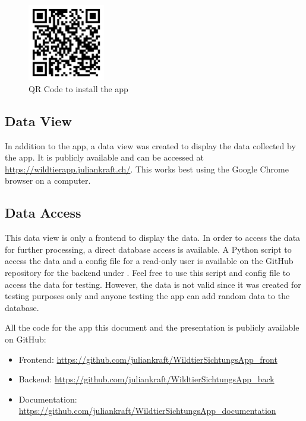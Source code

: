 \documentclass{josis}
\begin{document}
\begin{figure}[tbh]
    \centering
    \includegraphics[width=0.3\textwidth]{images/qr_code_app.png}
    \caption{QR Code to install the app}\label{fig:qr_code_app}
\end{figure}

\subsection{Data View}

In addition to the app, a data view was created to display the data collected by the app. It is publicly available and can be 
accessed at \url{https://wildtierapp.juliankraft.ch/}. This works best using the Google Chrome browser on a computer.

\subsection{Data Access}

This data view is only a frontend to display the data. In order to access the data for further processing, a direct database access is available.
A Python script to access the data and a config file for a read-only user is available on the GitHub repository 
for the backend under .
Feel free to use this script and config file to access the data for testing. However, the data is not valid since it was created for testing purposes only
and anyone testing the app can add random data to the database.

All the code for the app this document and the presentation is publicly available on GitHub:
\begin{itemize}
    \item Frontend: \url{https://github.com/juliankraft/WildtierSichtungsApp_front}
    \item Backend: \url{https://github.com/juliankraft/WildtierSichtungsApp_back}
    \item Documentation: \url{https://github.com/juliankraft/WildtierSichtungsApp_documentation}
\end{itemize}
\end{document}
